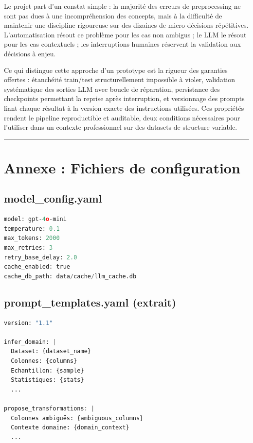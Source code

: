 \documentclass[12pt,a4paper]{article}
\begin{document}
Le projet part d'un constat simple : la majorité des erreurs de preprocessing ne sont
pas dues à une incompréhension des concepts, mais à la difficulté de maintenir une
discipline rigoureuse sur des dizaines de micro-décisions répétitives. L'automatisation
résout ce problème pour les cas non ambigus ; le LLM le résout pour les cas contextuels ;
les interruptions humaines réservent la validation aux décisions à enjeu.

Ce qui distingue cette approche d'un prototype est la rigueur des garanties offertes :
étanchéité train/test structurellement impossible à violer, validation systématique des
sorties LLM avec boucle de réparation, persistance des checkpoints permettant la reprise
après interruption, et versionnage des prompts liant chaque résultat à la version exacte
des instructions utilisées. Ces propriétés rendent le pipeline reproductible et
auditable, deux conditions nécessaires pour l'utiliser dans un contexte professionnel
sur des datasets de structure variable.

\vspace{1cm}
\noindent\rule{\linewidth}{0.4pt}

\appendix

\section*{Annexe : Fichiers de configuration}

\subsection*{model\_config.yaml}

\begin{lstlisting}[language=Python, caption={Configuration du modèle LLM.}]
model: gpt-4o-mini
temperature: 0.1
max_tokens: 2000
max_retries: 3
retry_base_delay: 2.0
cache_enabled: true
cache_db_path: data/cache/llm_cache.db
\end{lstlisting}

\subsection*{prompt\_templates.yaml (extrait)}

\begin{lstlisting}[language=Python, caption={En-tête du fichier de prompts.}]
version: "1.1"

infer_domain: |
  Dataset: {dataset_name}
  Colonnes: {columns}
  Echantillon: {sample}
  Statistiques: {stats}
  ...

propose_transformations: |
  Colonnes ambiguës: {ambiguous_columns}
  Contexte domaine: {domain_context}
  ...
\end{lstlisting}
\end{document}

